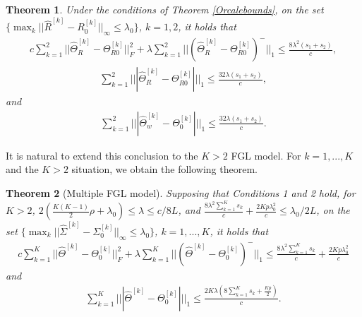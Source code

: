 \documentclass[review]{elsarticle}
\newcommand{\1}{{\bf 1}}
\newcommand{\0}{{\bf 0}}
\newtheorem{thm}{Theorem}
\begin{document}
\begin{thm}\label{weiandr}
 Under the conditions of Theorem \ref{Orcalebounds}, on the set $\{\max_{k}||\widehat{R}^{[k]}-R_{0}^{[k]}||_{\infty}\leq\lambda_0\}$, $k=1,2$, it holds that
\begin{equation}
\begin{split}
c\sum_{k=1}^{2}||\widehat{\Theta}_R^{[k]}-\Theta_{R0}^{[k]}||_{F}^{2}
+\lambda\sum_{k=1}^{2}||(\widehat{\Theta}_R^{[k]}-\Theta_{R0}^{[k]})^{-}||_1
\leq \frac{8\lambda^2(s_1+s_2)}{c},
\end{split}
\end{equation}
 \begin{equation}
\begin{split}
\sum_{k=1}^2|||\widehat{\Theta}_R^{[k]}-\Theta_{R0}^{[k]}|||_1
\leq\frac{32\lambda(s_1+s_2)}{c},
\end{split}
\end{equation}
 and
\begin{equation}
\begin{split}
\sum_{k=1}^2|||\widehat{\Theta}_w^{[k]}-\Theta_{0}^{[k]}|||_1
\leq\frac{32\lambda(s_1+s_2)}{c}.
\end{split}
\end{equation}
\end{thm}

 It is natural to extend this conclusion to the $K>2$ FGL model. For $k=1,...,K$ and the $K>2$ situation, we obtain the following theorem.

\begin{thm}[Multiple FGL model]\label{FGL}
 Supposing that Conditions 1 and 2 hold, for $K>2$, $2\left(\frac{K(K-1)}{2}\rho+\lambda_0\right)\leq\lambda\leq c/8L$, and $\frac{8\lambda^2\sum_{k=1}^{K}s_k}{c}+\frac{2Kp\lambda_0^2}{c}\leq \lambda_0 /2L$, on the set $\{\max_{k}||\widehat{\Sigma}^{[k]}-\Sigma_{0}^{[k]}||_{\infty}\leq\lambda_0\}$, $k=1,...,K$,
 it holds that
\begin{equation}\label{FGLeq1}
\begin{split}
c\sum_{k=1}^{K}||\widehat{\Theta}^{[k]}-\Theta_{0}^{[k]}||_{F}^{2}
+\lambda\sum_{k=1}^{K}||(\widehat{\Theta}^{[k]}-\Theta_{0}^{[k]})^{-}||_1
\leq \frac{8\lambda^2\sum_{k=1}^{K}s_k}{c}+\frac{2Kp\lambda_0^2}{c}
\end{split}
\end{equation}
 and
\begin{equation}\label{FGLeq2}
\begin{split}
\sum_{k=1}^K|||\widehat{\Theta}^{[k]}-\Theta_{0}^{[k]}|||_1\leq
\frac{2K\lambda\left(8\sum_{k=1}^{K}s_k+\frac{Kp}{2}\right)}{c}.
\end{split}
\end{equation}
\end{thm}
\end{document}
